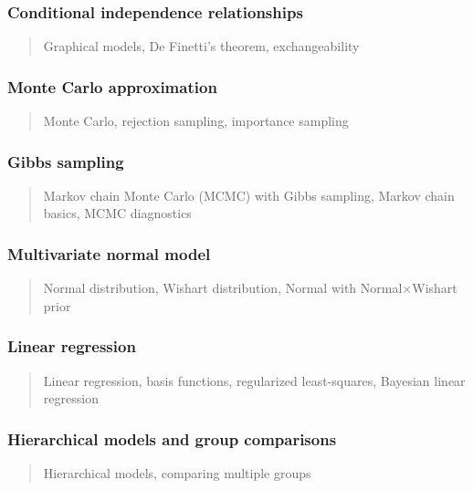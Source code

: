 \documentclass[12pt]{article}
\begin{document}
\subsubsection*{Conditional independence relationships}
\begin{quote}
Graphical models, De Finetti's theorem, exchangeability
\end{quote}


\subsubsection*{Monte Carlo approximation}
\begin{quote}
Monte Carlo, rejection sampling, importance sampling
\end{quote}

\subsubsection*{Gibbs sampling}
\begin{quote}
Markov chain Monte Carlo (MCMC) with Gibbs sampling, Markov chain basics, MCMC diagnostics
\end{quote}

\subsubsection*{Multivariate normal model}
\begin{quote}
Normal distribution, Wishart distribution, Normal with Normal$\times$Wishart prior
\end{quote}

\subsubsection*{Linear regression}
\begin{quote}
Linear regression, basis functions, regularized least-squares, Bayesian linear regression
\end{quote}

\subsubsection*{Hierarchical models and group comparisons}
\begin{quote}
Hierarchical models, comparing multiple groups
\end{quote}
\end{document}
